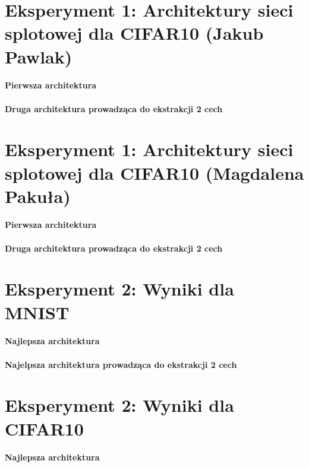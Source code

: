 \documentclass[10pt]{article}
\begin{document}
\section{Eksperyment 1: Architektury sieci splotowej dla CIFAR10 (Jakub Pawlak)}\label{sec:ex1-pawlak_cifar}

\paragraph{Pierwsza architektura}
\paragraph{Druga architektura prowadząca do ekstrakcji 2 cech}

\pagebreak
\section{Eksperyment 1: Architektury sieci splotowej dla CIFAR10 (Magdalena Pakuła)}\label{sec:ex1-pakula_cifar}

\paragraph{Pierwsza architektura}
\paragraph{Druga architektura prowadząca do ekstrakcji 2 cech}

\pagebreak
\section{Eksperyment 2: Wyniki dla MNIST}\label{sec:ex2_mnist}

\paragraph{Najlepsza architektura}
\paragraph{Najelpsza architektura prowadząca do ekstrakcji 2 cech}

\pagebreak
\section{Eksperyment 2: Wyniki dla CIFAR10}\label{sec:ex2_cifar}

\paragraph{Najlepsza architektura}
\end{document}
